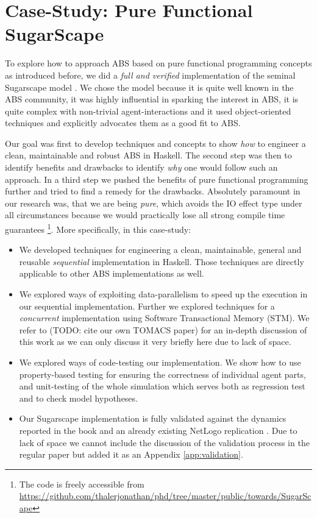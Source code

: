 \section{Case-Study: Pure Functional SugarScape}
\label{sec:case_study}

To explore how to approach ABS based on pure functional programming concepts as introduced before, we did a \textit{full and verified} implementation of the seminal Sugarscape model \cite{epstein_growing_1996}. We chose the model because it is quite well known in the ABS community, it was highly influential in sparking the interest in ABS, it is quite complex with non-trivial agent-interactions and it used object-oriented techniques and explicitly advocates them as a good fit to ABS. 

Our goal was first to develop techniques and concepts to show \textit{how} to engineer a clean, maintainable and robust ABS in Haskell. The second step was then to identify benefits and drawbacks to identify \textit{why} one would follow such an approach. In a third step we pushed the benefits of pure functional programming further and tried to find a remedy for the drawbacks. Absolutely paramount in our research was, that we are being \textit{pure}, which avoids the IO effect type under all circumstances because we would practically lose all strong compile time guarantees \footnote{The code is freely accessible from \url{https://github.com/thalerjonathan/phd/tree/master/public/towards/SugarScape}}. More specifically, in this case-study:

\begin{itemize}
	\item We developed techniques for engineering a clean, maintainable, general and reusable \textit{sequential} implementation in Haskell. Those techniques are directly applicable to other ABS implementations as well.
	
	\item We explored ways of exploiting data-parallelism to speed up the execution in our sequential implementation. Further we explored techniques for a \textit{concurrent} implementation using Software Transactional Memory (STM). We refer to (TODO: cite our own TOMACS paper) for an in-depth discussion of this work as we can only discuss it very briefly here due to lack of space.
	
	\item We explored ways of code-testing our implementation. We show how to use property-based testing for ensuring the correctness of individual agent parts, and unit-testing of the whole simulation which serves both as regression test and to check model hypotheses.
	
	\item Our Sugarscape implementation is fully validated against the dynamics reported in the book \cite{epstein_growing_1996} and an already existing NetLogo replication \cite{weaver_replicating_nodate}. Due to lack of space we cannot include the discussion of the validation process in the regular paper but added it as an Appendix \ref{app:validation}.
\end{itemize}

